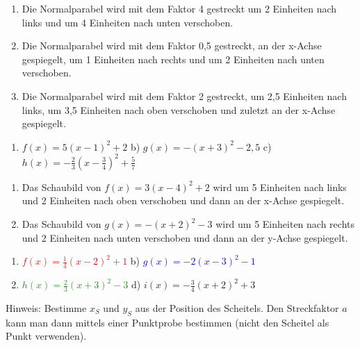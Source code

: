 \begin{Exercise}[title={Stelle jeweils die Funktionsgleichung auf und skizziere das Schaubild}, label=scheitelformA2]
	\begin{enumerate}[label=\alph*)]
		\item Die Normalparabel wird mit dem Faktor 4 gestreckt um 2 Einheiten nach links und um 4 Einheiten nach unten verschoben.
		\item Die Normalparabel wird mit dem Faktor 0,5 gestreckt, an der x-Achse gespiegelt, um 1 Einheiten nach rechts und um 2 Einheiten nach unten verschoben.
		\item Die Normalparabel wird mit dem Faktor 2 gestreckt, um 2,5 Einheiten nach links, um 3,5 Einheiten nach oben verschoben und zuletzt an der x-Achse gespiegelt.
	\end{enumerate}
\end{Exercise}
\begin{Exercise}[title={Beschreibe wie man die jeweilige Parabel aus der Normalparabel erhält.}, label=scheitelformA3]
	\begin{enumerate}[label=\alph*)]
		\item \(f(x)=5(x-1)^2+2\) \quad b) \(g(x)=-(x+3)^2-2,5\) \quad c) \(h(x)=-\tfrac{2}{3}\left(x-\tfrac{3}{4}\right)^2+\tfrac{5}{7}\)
	\end{enumerate}
\end{Exercise}
\begin{Exercise}[title={Stelle die Funktionsgleichung auf}, label=scheitelformA4]
	\begin{enumerate}[label=\alph*)]
		\item Das Schaubild von \(f(x)=3(x-4)^2+2\) wird um 5 Einheiten nach links und 2 Einheiten nach oben verschoben und dann an der x-Achse gespiegelt.
		\item Das Schaubild von \(g(x)=-(x+2)^2-3\) wird um 5 Einheiten nach rechts und 2 Einheiten nach unten verschoben und dann an der y-Achse gespiegelt.
	\end{enumerate}
\end{Exercise}\newpage

\begin{Answer}[ref=scheitelformA1]

	\begin{enumerate}[label=\alph*)]
		\item \textcolor{red}{\(f(x)=\tfrac{1}{4}\left(x-2\right)^2+1\)} \quad b) \textcolor{blue}{\(g(x)=-2\left(x-3\right)^2-1\)} \setcounter{enumi}{2}
		\item \textcolor{ForestGreen}{\(h(x)=\tfrac{2}{3}\left(x+3\right)^2-3\)} \quad d) \textcolor{YellowOrange}{\(i(x)=-\tfrac{3}{4}\left(x+2\right)^2+3\)}
	\end{enumerate}
	Hinweis: Bestimme \(x_S\) und \(y_S\) aus der Position des Scheitels. Den Streckfaktor \(a\) kann man dann mittels einer Punktprobe bestimmen (nicht den Scheitel als Punkt verwenden).
\end{Answer}

